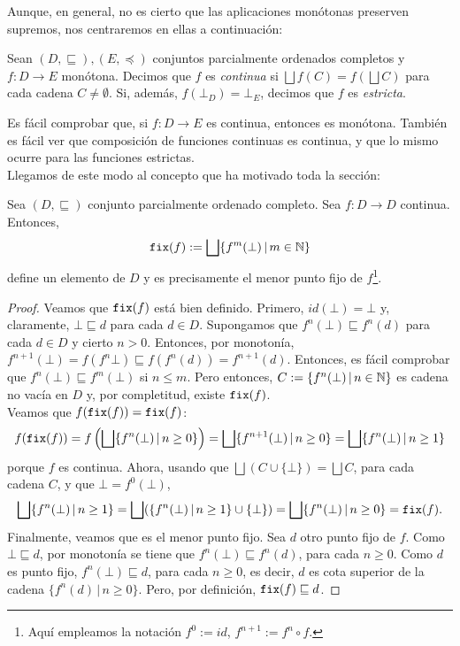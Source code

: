 Aunque, en general, no es cierto que las aplicaciones monótonas preserven supremos, nos centraremos en ellas a continuación:
\begin{definition}
Sean $(D, \sqsubseteq), (E, \preccurlyeq)$ conjuntos parcialmente ordenados completos y $f: D \to E$ monótona. Decimos que $f$ es \textit{continua} si $\bigsqcup f(C) = f(\bigsqcup C)$ para cada cadena $C \neq \emptyset$. Si, además, $f(\bot_D) = \bot_E$, decimos que $f$ es \textit{estricta}.
\end{definition}

Es fácil comprobar que, si $f: D \to E$ es continua, entonces es monótona. También es fácil ver que composición de funciones continuas es continua, y que lo mismo ocurre para las funciones estrictas. 
\\

Llegamos de este modo al concepto que ha motivado toda la sección:

\begin{theorem}\label{fixth}
Sea $(D, \sqsubseteq)$ conjunto parcialmente ordenado completo. Sea $f: D \to D$ continua. Entonces,
$$\text{\texttt{fix}}(f) := \bigsqcup\{f^m(\bot) \, | \, m \in \mathbb{N}\}$$
define un elemento de $D$ y es precisamente el menor punto fijo de $f$\footnote{Aquí empleamos la notación $f^0 := id$, $f^{n+1} := f^n\circ f$.}.
\end{theorem}
\begin{proof}
Veamos que $\texttt{fix}(f)$ está bien definido. Primero, $id(\bot) = \bot$ y, claramente, $\bot \sqsubseteq d$ para cada $d \in D$. Supongamos que $f^n(\bot) \sqsubseteq f^n(d)$ para cada $d \in D$ y cierto $n > 0$. Entonces, por monotonía, $f^{n+1}(\bot) = f(f^n{\bot}) \sqsubseteq f(f^n(d)) = f^{n+1}(d)$. Entonces, es fácil comprobar que $f^n(\bot) \sqsubseteq f^{m}(\bot)$ si $n \leq m$. Pero entonces, $C:= \{f^n(\bot) \, | \, n \in \mathbb{N}\}$ es cadena no vacía en $D$ y, por completitud, existe $\texttt{fix}(f)$.
\\

Veamos que $f(\texttt{fix}(f)) = \texttt{fix}(f)$:
$$f(\texttt{fix}(f)) = f\left(\bigsqcup\{f^n(\bot) \, | \, n \geq 0\}\right) = \bigsqcup\{f^{n+1}(\bot) \, | \, n \geq 0\} = \bigsqcup\{f^{n}(\bot) \, | \, n \geq 1\}$$ 
porque $f$ es continua. Ahora, usando que $\bigsqcup (C \cup \{\bot\}) = \bigsqcup C$, para cada cadena $C$, y que $\bot = f^0(\bot)$,
$$\bigsqcup\{f^{n}(\bot) \, | \, n \geq 1\} = \bigsqcup(\{f^{n}(\bot) \, | \, n \geq 1\}\cup \{\bot\}) = \bigsqcup\{f^{n}(\bot) \, | \, n \geq 0\} = \texttt{fix}(f).$$
Finalmente, veamos que es el menor punto fijo. Sea $d$ otro punto fijo de $f$. Como $\bot \sqsubseteq d$, por monotonía se tiene que $f^n(\bot) \sqsubseteq f^n(d)$, para cada $n \geq 0$. Como $d$ es punto fijo, $f^n(\bot) \sqsubseteq d$, para cada $n \geq 0$, es decir, $d$ es cota superior de la cadena $\{f^n(d) \, | \, n \geq 0\}$. Pero, por definición, $\texttt{fix}(f) \sqsubseteq d$.
\end{proof}

